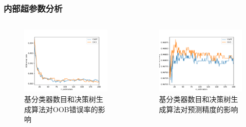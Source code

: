 \documentclass[10pt,aspectratio=43,mathserif]{beamer}
\begin{document}
		\begin{frame}
		  \frametitle{\textbf{内部超参数分析}}
            \begin{columns}
                \begin{figure}
                    \centering
                    \includegraphics[width=1\textwidth]{figures/hyperpara_criterion_oob_2.pdf}
                    \caption{基分类器数目和决策树生成算法对OOB错误率的影响}
                \end{figure}

                \begin{figure}
                    \centering
                    \includegraphics[width=1\textwidth]{figures/hyperpara_criterion_mean_acc_2.pdf}
                    \caption{基分类器数目和决策树生成算法对预测精度的影响}
                \end{figure}
            \end{columns}
        \end{frame}
        
\end{document}
